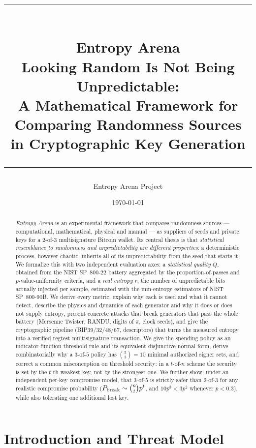 \documentclass[11pt,a4paper]{article}
\title{
    \vspace{-2cm}
    \rule{\linewidth}{0.4pt}\\[0.4cm]
    \textbf{\Large Entropy Arena}\\[0.3cm]
    \large Looking Random Is Not Being Unpredictable:\\
    A Mathematical Framework for Comparing Randomness Sources\\
    in Cryptographic Key Generation\\[0.4cm]
    \rule{\linewidth}{0.4pt}
}
\author{\normalsize Entropy Arena Project}
\date{\today}
\theoremstyle{plain}
\theoremstyle{definition}
\begin{document}
\maketitle

\begin{abstract}
\noindent
\emph{Entropy Arena} is an experimental framework that compares randomness
sources --- computational, mathematical, physical and manual --- as suppliers of
seeds and private keys for a $2$-of-$3$ multisignature Bitcoin wallet. Its
central thesis is that \emph{statistical resemblance to randomness and
unpredictability are different properties}: a deterministic process, however
chaotic, inherits all of its unpredictability from the seed that starts it. We
formalize this with two independent evaluation axes: a \emph{statistical
quality} $Q$, obtained from the NIST SP~800-22 battery aggregated by the
proportion-of-passes and $p$-value-uniformity criteria, and a \emph{real
entropy} $r$, the number of unpredictable bits actually injected per sample,
estimated with the min-entropy estimators of NIST SP~800-90B. We derive every
metric, explain why each is used and what it cannot detect, describe the
physics and dynamics of each generator and why it does or does not supply
entropy, present concrete attacks that break generators that pass the whole
battery (Mersenne Twister, RANDU, digits of $\pi$, clock seeds), and give the
cryptographic pipeline (BIP39/32/48/67, descriptors) that turns the measured
entropy into a verified regtest multisignature transaction. We give the
spending policy as an indicator-function threshold rule and its equivalent
disjunctive normal form, derive combinatorially why a $3$-of-$5$ policy has
$\binom{5}{3}=10$ minimal authorized signer sets, and correct a common
misconception on threshold security: in a $t$-of-$n$ scheme the security is
set by the $t$-th weakest key, not by the strongest one. We further show,
under an independent per-key compromise model, that $3$-of-$5$ is strictly
safer than $2$-of-$3$ for any realistic compromise probability
($P_{\rm break}\sim\binom{n}{t}p^t$, and $10p^3<3p^2$ whenever $p<0.3$), while
also tolerating one additional lost key.
\end{abstract}

\tableofcontents
\newpage

\section{Introduction and Threat Model}
\end{document}
